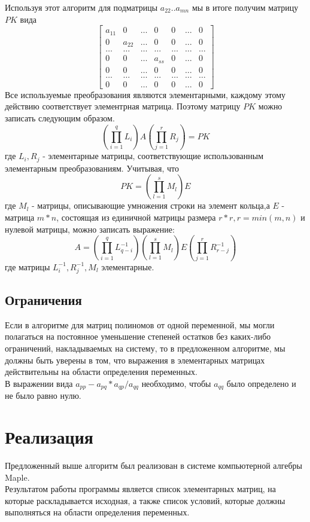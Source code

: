 \documentclass[14pt, a4paper]{extreport}
\begin{document}
	Используя этот алгоритм для подматрицы $a_{22}..a_{mn}$ мы в итоге получим матрицу $PK$ вида
	\[
		\begin{bmatrix}
			a_{11} & 0 & \dots & 0 & 0 & \dots & 0 \\
			0 & a_{22} & \dots & 0 & 0 & \dots & 0 \\
			\dots & \dots & \dots & \dots & \dots & \dots & \dots \\
			0 & 0 & \dots & a_{ss} & 0 & \dots & 0 \\
			0 & 0 & \dots & 0 & 0 & \dots & 0 \\
			\dots & \dots & \dots & \dots & \dots & \dots & \dots \\
			0 & 0 & \dots & 0 & 0 & \dots & 0
		\end{bmatrix}
	\]
	\newpage
	\noindent Все используемые преобразования являются элементарными, каждому этому действию соответствует элементрная матрица.
	Поэтому матрицу $PK$ можно записать следующим образом.
	\begin{equation*}
		(\prod\limits_{i=1}^{q}L_{i})A(\prod\limits_{j=1}^{r}R_{j}) = PK
	\end{equation*}
	где $L_{i},R_{j}$ - элементарные матрицы, соответствующие использованным элементарным преобразованиям.
	Учитывая, что
	\begin{equation*}
		PK = (\prod\limits_{l=1}^{s}M_{l})E
	\end{equation*}
	где $M_{l}$ - матрицы, описывающие умножения строки на элемент кольца,а $E$ -
	матрица $m*n$, состоящая из единичной матрицы размера $r*r, r=min(m,n)$
	и нулевой матрицы, можно записать выражение:
	\begin{equation*}
		A =
		(\prod\limits_{i=1}^{q}L_{q-i}^{-1})
		(\prod\limits_{l=1}^{s}M_{l})
		E
		(\prod\limits_{j=1}^{r}R_{r-j}^{-1})
	\end{equation*}
	где матрицы $L_{i}^{-1},R_{j}^{-1},M_{l}$ элементарные.
	\section{Ограничения}
	Если в алгоритме для матриц полиномов от одной переменной, мы могли полагаться на постоянное уменьшение степеней остатков
	без каких-либо ограничений, накладываемых на систему,
	то в предложенном алгоритме, мы должны быть уверены в том, что выражения в элементарных матрицах действительны на области определения переменных.\\
	В выражении вида $a_{pp} - a_{pq}*a_{qp}/a_{qq}$ необходимо, чтобы $a_{qq}$ было определено и не было равно нулю.
\chapter{Реализация}
	Предложенный выше алгоритм был реализован в системе компьютерной алгебры Maple.\\
	Результатом работы программы является список элементарных матриц, на которые раскладывается исходная,
	а также список условий, которые должны выполняться на области определения переменных.
\end{document}
